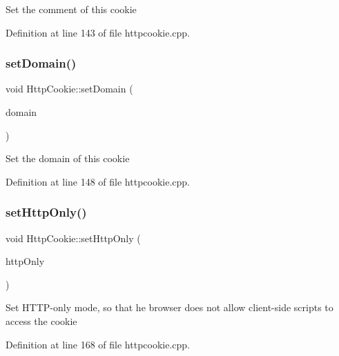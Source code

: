 Set the comment of this cookie 

Definition at line 143 of file httpcookie.\+cpp.

\mbox{\label{classstefanfrings_1_1_http_cookie_a8ca88be725bee61644b546807f62ee7f}} 
\subsubsection{\texorpdfstring{set\+Domain()}{setDomain()}}
{\footnotesize\ttfamily void Http\+Cookie\+::set\+Domain (\begin{DoxyParamCaption}\item[{const Q\+Byte\+Array}]{domain }\end{DoxyParamCaption})}

Set the domain of this cookie 

Definition at line 148 of file httpcookie.\+cpp.

\mbox{\label{classstefanfrings_1_1_http_cookie_ae1fa9c390bc258599680e06b53902273}} 
\subsubsection{\texorpdfstring{set\+Http\+Only()}{setHttpOnly()}}
{\footnotesize\ttfamily void Http\+Cookie\+::set\+Http\+Only (\begin{DoxyParamCaption}\item[{const bool}]{http\+Only }\end{DoxyParamCaption})}

Set H\+T\+T\+P-\/only mode, so that he browser does not allow client-\/side scripts to access the cookie 

Definition at line 168 of file httpcookie.\+cpp.

\mbox{\label{classstefanfrings_1_1_http_cookie_ae17c01f48d8efbd553e954e0cb8a06b0}} 
